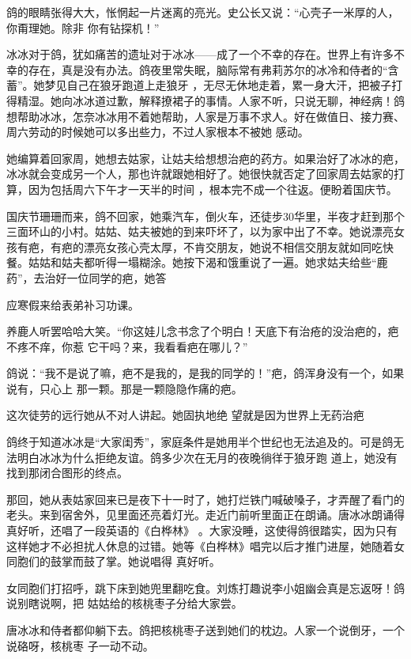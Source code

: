 \documentclass{article}
\begin{document}
鸽的眼睛张得大大，怅惘起一片迷离的亮光。史公长又说：“心壳子一米厚的人，你甭理她。除非
你有钻探机！” 

冰冰对于鸽，犹如痛苦的遗址对于冰冰——成了一个不幸的存在。世界上有许多不幸的存在，真是没有办法。鸽夜里常失眠，脑际常有弗莉苏尔的冰冷和侍者的“含蓄”。她梦见自己在狼牙跑道上走狼牙
\newpage
，无尽无休地走着，累一身大汗，把被子打得精湿。她向冰冰道过歉，解释撩裙子的事情。人家不听，只说无聊，神经病！鸽想帮助冰冰，怎奈冰冰用不着她帮助，人家是万事不求人。好在做值日、接力赛、周六劳动的时候她可以多出些力，不过人家根本不被她
感动。 

她编算着回家周，她想去姑家，让姑夫给想想治疤的药方。如果治好了冰冰的疤，冰冰就会变成另一个人，那也许就跟她相好了。她很快就否定了回家周去姑家的打算，因为包括周六下午才一天半的时间
，根本完不成一个往返。便盼着国庆节。 

国庆节珊珊而来，鸽不回家，她乘汽车，倒火车，还徒步30华里，半夜才赶到那个三面环山的小村。姑姑、姑夫被她的到来吓坏了，以为家中出了不幸。她说漂亮女孩有疤，有疤的漂亮女孩心壳太厚，不肯交朋友，她说不相信交朋友就如同吃快餐。姑姑和姑夫都听得一塌糊涂。她按下渴和饿重说了一遍。她求姑夫给些“鹿药”，去治好一位同学的疤，她答

\newpage
应寒假来给表弟补习功课。 

养鹿人听罢哈哈大笑。“你这娃儿念书念了个明白！天底下有治疮的没治疤的，疤不疼不痒，你惹
它干吗？来，我看看疤在哪儿？” 

鸽说：“我不是说了嘛，疤不是我的，是我的同学的！”疤，鸽浑身没有一个，如果说有，只心上
那一颗。那是一颗隐隐作痛的疤。 

这次徒劳的远行她从不对人讲起。她固执地绝
望就是因为世界上无药治疤 

鸽终于知道冰冰是“大家闺秀”，家庭条件是她用半个世纪也无法追及的。可是鸽无法明白冰冰为什么拒绝友谊。鸽多少次在无月的夜晚徜徉于狼牙跑
道上，她没有找到那闭合图形的终点。 

那回，她从表姑家回来已是夜下十一时了，她打烂铁门喊破嗓子，才弄醒了看门的老头。来到宿舍外，见里面还亮着灯光。走近门前听里面正在朗诵。唐冰冰朗诵得真好听，还唱了一段英语的《白桦林》
\newpage
。大家没睡，这使得鸽很踏实，因为只有这样她才不必担扰人休息的过错。她等《白桦林》唱完以后才推门进屋，她随着女同胞们的鼓掌而鼓了掌。她说唱得
真好听。 

女同胞们打招呼，跳下床到她兜里翻吃食。刘炼打趣说李小姐幽会真是忘返呀！鸽说别瞎说啊，把
姑姑给的核桃枣子分给大家尝。 

唐冰冰和侍者都仰躺下去。鸽把核桃枣子送到她们的枕边。人家一个说倒牙，一个说硌呀，核桃枣
子一动不动。 
\end{document}
